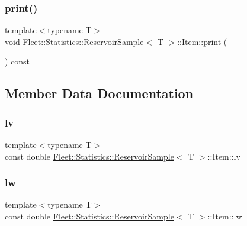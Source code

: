 \subsubsection{\texorpdfstring{print()}{print()}}
{\footnotesize\ttfamily template$<$typename T$>$ \\
void \hyperlink{class_fleet_1_1_statistics_1_1_reservoir_sample}{Fleet\+::\+Statistics\+::\+Reservoir\+Sample}$<$ T $>$\+::Item\+::print (\begin{DoxyParamCaption}{ }\end{DoxyParamCaption}) const\hspace{0.3cm}{\ttfamily [inline]}}



\subsection{Member Data Documentation}
\mbox{\label{class_fleet_1_1_statistics_1_1_reservoir_sample_1_1_item_a0037b193d6712481b90416b51f2eb9d5}} 
\subsubsection{\texorpdfstring{lv}{lv}}
{\footnotesize\ttfamily template$<$typename T$>$ \\
const double \hyperlink{class_fleet_1_1_statistics_1_1_reservoir_sample}{Fleet\+::\+Statistics\+::\+Reservoir\+Sample}$<$ T $>$\+::Item\+::lv}

\mbox{\label{class_fleet_1_1_statistics_1_1_reservoir_sample_1_1_item_af6e0c0e3569786a8896fcd7ab758a587}} 
\subsubsection{\texorpdfstring{lw}{lw}}
{\footnotesize\ttfamily template$<$typename T$>$ \\
const double \hyperlink{class_fleet_1_1_statistics_1_1_reservoir_sample}{Fleet\+::\+Statistics\+::\+Reservoir\+Sample}$<$ T $>$\+::Item\+::lw}

